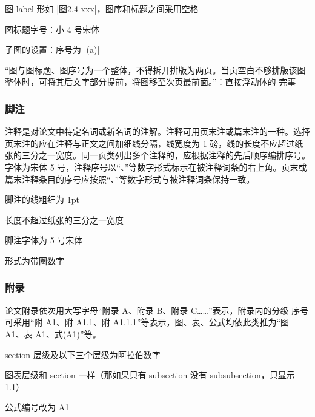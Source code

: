 \begin{points}
  \item 图 label 形如 |图2.4 xxx|，图序和标题之间采用空格
  \item 图标题字号：小 4 号宋体
  \item 子图的设置：序号为 |(a)|
  \item “图与图标题、图序号为一个整体，不得拆开排版为两页。当页空白不够排版该图 整体时，可将其后文字部分提前，将图移至次页最前面。”：直接浮动体的  完事
\end{points}


\subsubsection{脚注}

\begin{reference}
  注释是对论文中特定名词或新名词的注解。注释可用页末注或篇末注的一种。选择页末注的应在注释与正文之间加细线分隔，线宽度为 1 磅，线的长度不应超过纸张的三分之一宽度。同一页类列出多个注释的，应根据注释的先后顺序编排序号。字体为宋体 5 号，注释序号以“、”等数字形式标示在被注释词条的右上角。页末或 篇末注释条目的序号应按照“、”等数字形式与被注释词条保持一致。
\end{reference}

\begin{points}
  \item 脚注的线粗细为 1pt
  \item 长度不超过纸张的三分之一宽度
  \item 脚注字体为 5 号宋体
  \item 形式为带圈数字
\end{points}


\subsubsection{附录}

\begin{reference}
  论文附录依次用大写字母“附录 A、附录 B、附录 C……”表示，附录内的分级 序号可采用“附 A1、附 A1.1、附 A1.1.1”等表示，图、表、公式均依此类推为“图 A1、表 A1、式(A1)”等。
\end{reference}

\begin{points}
  \item section 层级及以下三个层级为阿拉伯数字
  \item 图表层级和 section 一样（那如果只有 subsection 没有 subsubsection，只显示 1.1）
  \item 公式编号改为 A1
\end{points}


